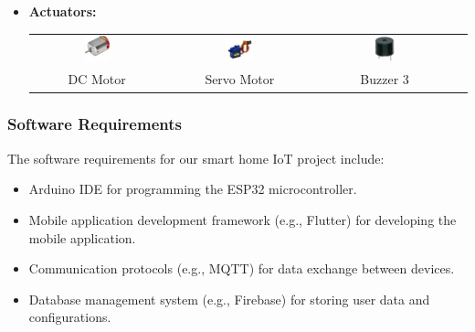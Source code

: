 \begin{itemize}
    \item \textbf{Actuators:}
    
    \begin{tabular}{cccc}
        \includegraphics[width=0.20\textwidth]{figs/motor.png} &
        \includegraphics[width=0.20\textwidth]{figs/servo.png} &
        \includegraphics[width=0.20\textwidth]{figs/buzzer.png}\\
        
        DC Motor & Servo Motor & Buzzer 3\\
    \end{tabular}
\end{itemize}



\subsubsection{Software Requirements}
The software requirements for our smart home IoT project include:
\begin{itemize}
    \item Arduino IDE for programming the ESP32 microcontroller.
    \item Mobile application development framework (e.g., Flutter) for developing the mobile application.
    \item Communication protocols (e.g., MQTT) for data exchange between devices.
    \item Database management system (e.g., Firebase) for storing user data and configurations.
\end{itemize}
